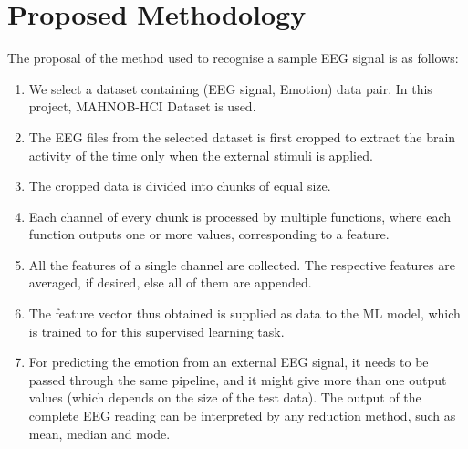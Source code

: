 
\chapter{Proposed Methodology} %

\label{Chapter3} %


The proposal of the method used to recognise a sample EEG signal is as follows:
\begin{enumerate}
    \item We select a dataset containing (EEG signal, Emotion) data pair. In this project, MAHNOB-HCI Dataset is used.
    \item The EEG files from the selected dataset is first cropped to extract the brain activity of the time only when the external stimuli is applied.
    \item The cropped data is divided into chunks of equal size.
    \item Each channel of every chunk is processed by multiple functions, where each function outputs one or more values, corresponding to a feature.
    \item All the features of a single channel are collected. The respective features are averaged, if desired, else all of them are appended.
    \item The feature vector thus obtained is supplied as data to the ML model, which is trained to for this supervised learning task.
    \item For predicting the emotion from an external EEG signal, it needs to be passed through the same pipeline, and it might give more than one output values (which depends on the size of the test data). The output of the complete EEG reading can be interpreted by any reduction method, such as mean, median and mode.
\end{enumerate}